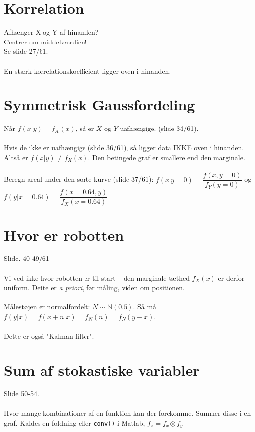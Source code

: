 \documentclass[Main]{subfiles}
\begin{document}
\section{Korrelation}

Afhænger X og Y af hinanden?\\
Centrer om middelværdien!
\\
Se slide 27/61.
\\
\\
En stærk korrelationskoefficient ligger oven i hinanden.

\section{Symmetrisk Gaussfordeling}

Når $f(x|y) = f_X(x)$, så er $X$ og $Y$ uafhængige. (slide 34/61).
\\\\
Hvis de ikke er uafhængige (slide 36/61), så ligger data IKKE oven i hinanden.
Altså er $f(x|y) \not = f_X(x)$.
Den betingede graf er smallere end den marginale.
\\
\\
Beregn areal under den sorte kurve (slide 37/61): $f(x|y=0) = \dfrac{f(x,y=0)}{f_Y(y=0)}$ og $f(y|x=0.64) = \dfrac{f(x=0.64, y)}{f_X(x=0.64)}$






\section{Hvor er robotten}
Slide. 40-49/61
\\
\\
Vi ved ikke hvor robotten er til start -- den marginale tæthed $f_X(x)$ er derfor uniform.
Dette er \textit{a priori}, før måling, viden om positionen.
\\
\\
Målestøjen er normalfordelt: $ N \sim \mathbb{N}(0.5)$.
Så må $f(y|x) = f(x+n|x) = f_N(n) = f_N(y-x)$.
\\
\\
Dette er også "Kalman-filter".


\section{Sum af stokastiske variabler}
Slide 50-54.
\\
\\
Hvor mange kombinationer af en funktion kan der forekomme. Summer disse i en graf.
Kaldes en foldning eller \texttt{conv()} i Matlab, $ f_z = f_x \otimes f_y$
\end{document}
